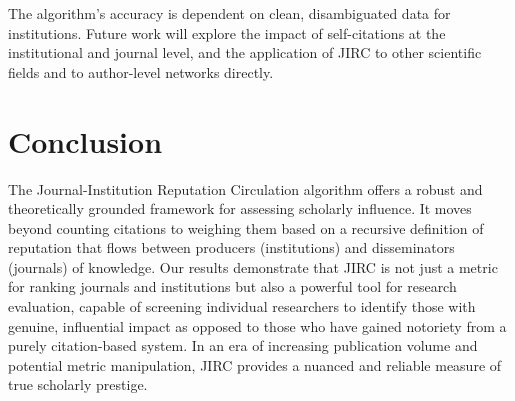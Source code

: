 \documentclass[10pt]{article}
\begin{document}
The algorithm's accuracy is dependent on clean, disambiguated data for institutions. Future work will explore the impact of self-citations at the institutional and journal level, and the application of JIRC to other scientific fields and to author-level networks directly.
\section{Conclusion}

The Journal-Institution Reputation Circulation algorithm offers a robust and theoretically grounded framework for assessing scholarly influence. It moves beyond counting citations to weighing them based on a recursive definition of reputation that flows between producers (institutions) and disseminators (journals) of knowledge. Our results demonstrate that JIRC is not just a metric for ranking journals and institutions but also a powerful tool for research evaluation, capable of screening individual researchers to identify those with genuine, influential impact as opposed to those who have gained notoriety from a purely citation-based system. In an era of increasing publication volume and potential metric manipulation, JIRC provides a nuanced and reliable measure of true scholarly prestige.






\end{document}
